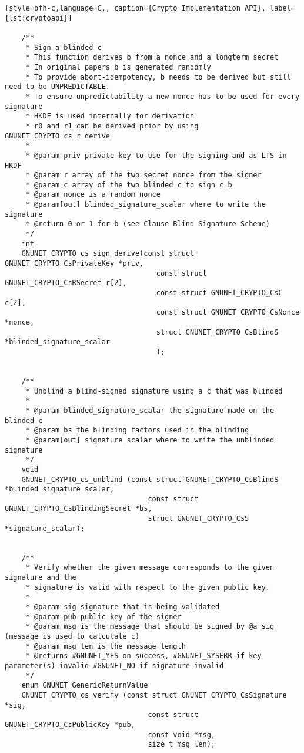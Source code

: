 \begin{lstlisting}[style=bfh-c,language=C,, caption={Crypto Implementation API}, label={lst:cryptoapi}]
    
    /**
     * Sign a blinded c
     * This function derives b from a nonce and a longterm secret
     * In original papers b is generated randomly
     * To provide abort-idempotency, b needs to be derived but still need to be UNPREDICTABLE.
     * To ensure unpredictability a new nonce has to be used for every signature
     * HKDF is used internally for derivation
     * r0 and r1 can be derived prior by using GNUNET_CRYPTO_cs_r_derive
     * 
     * @param priv private key to use for the signing and as LTS in HKDF
     * @param r array of the two secret nonce from the signer
     * @param c array of the two blinded c to sign c_b
     * @param nonce is a random nonce
     * @param[out] blinded_signature_scalar where to write the signature
     * @return 0 or 1 for b (see Clause Blind Signature Scheme)
     */
    int
    GNUNET_CRYPTO_cs_sign_derive(const struct GNUNET_CRYPTO_CsPrivateKey *priv,
                                    const struct GNUNET_CRYPTO_CsRSecret r[2],
                                    const struct GNUNET_CRYPTO_CsC c[2],
                                    const struct GNUNET_CRYPTO_CsNonce *nonce,
                                    struct GNUNET_CRYPTO_CsBlindS *blinded_signature_scalar
                                    );
    
    
    /**
     * Unblind a blind-signed signature using a c that was blinded
     *
     * @param blinded_signature_scalar the signature made on the blinded c
     * @param bs the blinding factors used in the blinding
     * @param[out] signature_scalar where to write the unblinded signature
     */
    void
    GNUNET_CRYPTO_cs_unblind (const struct GNUNET_CRYPTO_CsBlindS *blinded_signature_scalar,
                                  const struct GNUNET_CRYPTO_CsBlindingSecret *bs,
                                  struct GNUNET_CRYPTO_CsS *signature_scalar);
    
    
    /**
     * Verify whether the given message corresponds to the given signature and the
     * signature is valid with respect to the given public key.
     *
     * @param sig signature that is being validated
     * @param pub public key of the signer
     * @param msg is the message that should be signed by @a sig  (message is used to calculate c)
     * @param msg_len is the message length
     * @returns #GNUNET_YES on success, #GNUNET_SYSERR if key parameter(s) invalid #GNUNET_NO if signature invalid
     */
    enum GNUNET_GenericReturnValue
    GNUNET_CRYPTO_cs_verify (const struct GNUNET_CRYPTO_CsSignature *sig,
                                  const struct GNUNET_CRYPTO_CsPublicKey *pub,
                                  const void *msg,
                                  size_t msg_len);
    
\end{lstlisting}
